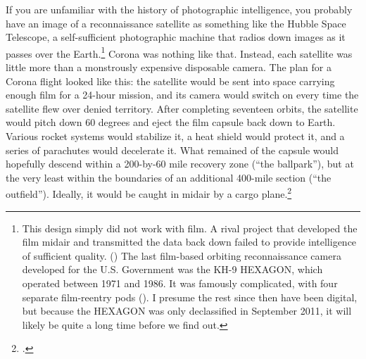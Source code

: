 \documentclass{report}
\begin{document}
If you are unfamiliar with the history of photographic intelligence, you probably have an image of a reconnaissance satellite as something like the Hubble Space Telescope, a self-sufficient photographic machine that radios down images as it passes over the Earth.\footnote{This design simply did not work with film. A rival project that developed the film midair and transmitted the data back down failed to provide intelligence of sufficient quality. (\cite[p.~203-204]{brugioni_eyes_2010}) The last film-based orbiting reconnaissance camera developed for the U.S. Government was the KH-9 HEXAGON, which operated between 1971 and 1986. It was famously complicated, with four separate film-reentry pods (\cite{pressel_spy_2013}). I presume the rest since then have been digital, but because the HEXAGON was only declassified in September 2011, it will likely be quite a long time before we find out.} Corona was nothing like that. Instead, each satellite was little more than a monstrously expensive disposable camera. The plan for a Corona flight looked like this: the satellite would be sent into space carrying enough film for a 24-hour mission, and its camera would switch on every time the satellite flew over denied territory. After completing seventeen orbits, the satellite would pitch down 60 degrees and eject the film capsule back down to Earth. Various rocket systems would stabilize it, a heat shield would protect it, and a series of parachutes would decelerate it. What remained of the capsule would hopefully descend within a 200-by-60 mile recovery zone (``the ballpark''), but at the very least within the boundaries of an additional 400-mile section (``the outfield''). Ideally, it would be caught in midair by a cargo plane.\footcite[p.~56]{peebles_corona_1997}
\end{document}
